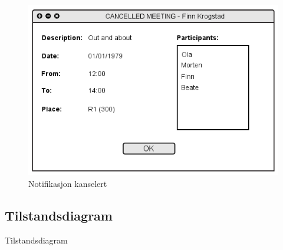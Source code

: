 \begin{figure}[H]
\centering
\includegraphics[scale=0.65]{images/notifikasjon_kanselert.png}
\caption{Notifikasjon kanselert}
\label{notifikasjon_kanselert_image}
\end{figure}


\subsection{Tilstandsdiagram}
Tilstandsdiagram